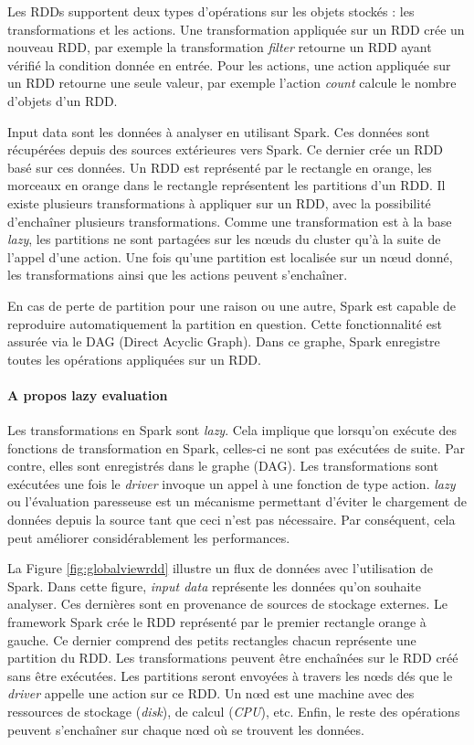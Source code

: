 Les RDDs supportent deux types d'opérations sur les objets stockés : les transformations et les actions. Une  transformation appliquée sur un RDD crée un nouveau RDD, par exemple la transformation \textit{filter} retourne un RDD ayant vérifié la condition donnée en entrée.  Pour les actions, une action appliquée sur un RDD retourne une seule valeur, par exemple l'action \textit{count} calcule le nombre d'objets d'un RDD.

Input data sont les données à analyser en utilisant Spark. Ces données sont récupérées depuis des sources extérieures vers Spark. Ce dernier crée un RDD basé sur ces données. Un RDD est représenté par le rectangle en orange, les morceaux en orange dans le rectangle représentent les partitions d'un RDD. 
Il existe plusieurs transformations à appliquer sur un RDD, avec la possibilité d'enchaîner plusieurs transformations. Comme une transformation est à la base  \textit{lazy}, les partitions ne sont partagées sur les n\oe{}uds du cluster qu'à la suite de l'appel d'une action. Une fois qu'une partition est localisée sur un n\oe{}ud donné, les transformations ainsi que les actions peuvent s'enchaîner.

En cas de perte de partition pour une raison ou une autre, Spark est capable de reproduire automatiquement la partition en question. Cette fonctionnalité est assurée via le DAG (Direct Acyclic Graph). Dans ce graphe, Spark enregistre toutes les opérations appliquées sur un RDD.
\paragraph{A propos lazy evaluation} \label{lazy-evaluation}
Les transformations en Spark sont \textit{lazy}. Cela implique que lorsqu'on exécute des fonctions de transformation en Spark, celles-ci ne sont pas exécutées de suite. Par contre, elles sont enregistrés dans le graphe (DAG).  Les transformations sont exécutées une fois le \textit{driver} invoque un appel à une fonction de type action. \textit{lazy} ou l'évaluation paresseuse est un mécanisme permettant d'éviter le chargement de données depuis la source tant que ceci n'est pas nécessaire. Par conséquent, cela peut améliorer considérablement les performances.

 La Figure 	\ref{fig:globalviewrdd} illustre un flux de données avec l'utilisation de Spark. Dans cette figure, \textit{input data} représente les données qu'on souhaite analyser. Ces dernières sont en provenance de sources de stockage externes. Le framework Spark crée le RDD représenté par le premier rectangle orange à gauche. Ce dernier  comprend  des petits rectangles chacun représente une partition du RDD.  Les transformations  peuvent être enchaînées sur le RDD créé sans être exécutées. Les partitions seront envoyées à travers les n\oe{}ds dés que le \textit{driver} appelle une action sur ce RDD. Un n\oe{}d est une machine avec des ressources de stockage (\textit{disk}), de calcul (\textit{CPU}), etc. Enfin, le reste des opérations peuvent s'enchaîner  sur chaque n\oe{}d où se trouvent les données.
 
